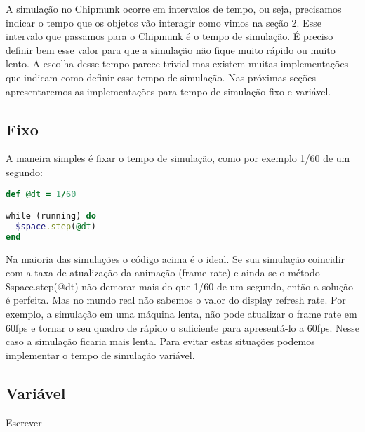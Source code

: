 A simulação no Chipmunk ocorre em intervalos de tempo, ou seja, precisamos indicar o tempo que os objetos vão interagir como vimos na seção 2. 
Esse intervalo que passamos para o Chipmunk é o tempo de simulação. É preciso definir bem esse valor para que a simulação não fique muito rápido 
ou muito lento. A escolha desse tempo parece trivial mas existem muitas implementações que indicam como definir esse tempo de simulação. Nas 
próximas seções apresentaremos as implementações para tempo de simulação fixo e variável.

\subsection{Fixo}

A maneira simples é fixar o tempo de simulação, como por exemplo 1/60 de um segundo:

\begin{lstlisting}[language=Ruby, caption=Implementação de tempo de simulação fixo]
def @dt = 1/60

while (running) do
  $space.step(@dt)
end
\end{lstlisting}

Na maioria das simulações o código acima é o ideal. Se sua simulação coincidir com a taxa de atualização da animação (frame rate) 
e ainda se o método \$space.step(@dt) não demorar mais do que 1/60 de um segundo, então a solução é perfeita. Mas no mundo real não sabemos
o valor do display refresh rate. Por exemplo, a simulação em uma máquina lenta, não pode atualizar o frame rate em 60fps e tornar o seu 
quadro de rápido o suficiente para apresentá-lo a 60fps. Nesse caso a simulação ficaria mais lenta. Para evitar estas situações podemos 
implementar o tempo de simulação variável.

\subsection{Variável}

Escrever
